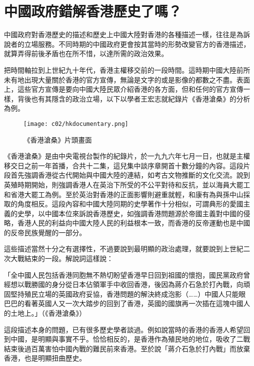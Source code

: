 \section{中國政府錯解香港歷史了嗎？}

中國政府對香港歷史的描述和歷史上中國大陸對香港的各種描述一樣，往往是為訴說者的立場服務。不同時期的中國政府更會按其當時的形勢改變官方的香港描述，就算弄得前後矛盾也在所不惜，以達所需的政治效果。

把時間軸拉到上世紀九十年代，香港主權移交前的一段時間。這時期中國大陸前所未有地出現大量關於香港的官方宣傳，無論是文字的或是影像的都數之不盡。表面上，這些官方宣傳是要向中國大陸民眾介紹香港的各方面，但和任何的官方宣傳一樣，背後也有其隱含的政治立場，以下以學者王宏志就紀錄片《香港滄桑》的分析為例。

\begin{figure}[htbp]
    \centering
    \texttt{[image: c02/hkdocumentary.png]}
    \caption{《香港滄桑》片頭畫面} 
\end{figure}

《香港滄桑》是由中央電視台製作的紀錄片，於一九九六年七月一日，也就是主權移交日之前一年首播，合共十二集，這兒集中談序章開首十數分鐘的內容。這段片段首先強調香港從古代開始與中國大陸的連結，如考古文物推斷的文化交流。說到英殖時期開始，則強調香港人在英治下所受的不公平對待和反抗，並以海員大罷工和省港大罷工為例。至於英治對香港的正面影響則避重就輕，和康有為與孫中山採取的角度相反。這段內容和中國大陸同期的史學著作十分相似，可謂典形的愛國主義的史學，以中國本位來訴說香港歷史，如強調香港問題源於帝國主義對中國的侵略，香港人民的利益向中國大陸人民的利益根本一致，而香港的反帝運動也是中國的反帝民族覺醒的一部分。

這些描述當然十分之有選擇性，不過要說到最明顯的政治處理，就要說到上世紀二次大戰結束的一段。解說詞這樣說：

\begin{displayquote}
    「全中國人民包括香港同胞無不熱切盼望香港早日回到祖國的懷抱，國民黨政府曾經想以戰勝國的身分從日本佔領軍手中收回香港，後因為蔣介石急於打內戰，向頑固堅持殖民立場的英國政府妥協，香港問題的解決終成泡影（……）中國人只能眼巴巴的看著英國人又一次大踏步的回到了香港，英國的國旗再一次插在這塊中國人的土地上。」（《香港滄桑》）
\end{displayquote}

這段描述本身的問題，已有很多歷史學者談過。例如說當時的香港的香港人希望回到中國，是明顯與事實不乎。恰恰相反的，是香港作為殖民地的地位，吸收了二戰結束後過百萬害怕中國內戰的難民前來香港。至於說「蔣介石急於打內戰」而放棄香港，也是明顯扭曲歷史。

